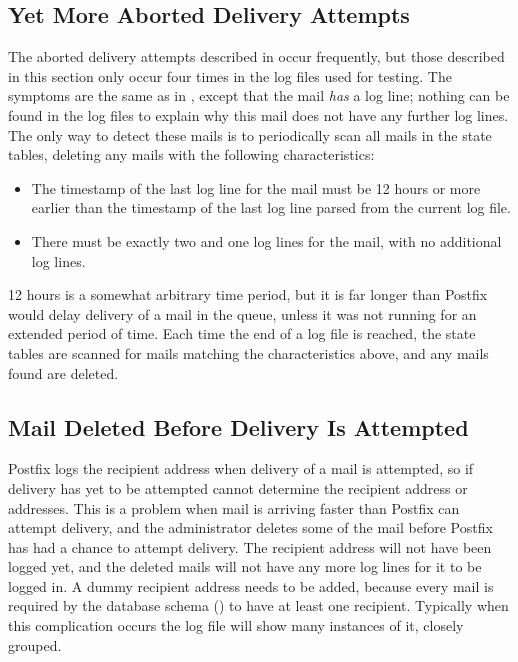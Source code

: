 \subsection{Yet More Aborted Delivery Attempts}

\label{yet more aborted delivery attempts}

The aborted delivery attempts described in  occur frequently, but those described in this section only occur
four times in the \numberOFlogFILES{} log files used for testing.  The
symptoms are the same as in , except
that the mail \textit{has\/} a  log line; nothing can be
found in the log files to explain why this mail does not have any further
log lines.  The only way to detect these mails is to periodically scan all
mails in the state tables, deleting any mails with the following
characteristics:

\begin{itemize}

    \item The timestamp of the last log line for the mail must be 12 hours
        or more earlier than the timestamp of the last log line parsed from
        the current log file.

    \item There must be exactly two  and one 
        log lines for the mail, with no additional log lines.

\end{itemize}

12 hours is a somewhat arbitrary time period, but it is far longer than
Postfix would delay delivery of a mail in the queue, unless it was not
running for an extended period of time.  Each time the end of a log file is
reached, the state tables are scanned for mails matching the
characteristics above, and any mails found are deleted.

\subsection{Mail Deleted Before Delivery Is Attempted}

\label{Mail deleted before delivery is attempted}

Postfix logs the recipient address when delivery of a mail is attempted, so
if delivery has yet to be attempted \parsername{} cannot determine the
recipient address or addresses.  This is a problem when mail is arriving
faster than Postfix can attempt delivery, and the administrator deletes
some of the mail before Postfix has had a chance to attempt delivery.  The
recipient address will not have been logged yet, and the deleted mails will
not have any more log lines for it to be logged in.  A dummy recipient
address needs to be added, because every mail is required by the database
schema () to have at least one recipient.
Typically when this complication occurs the log file will show many
instances of it, closely grouped.

